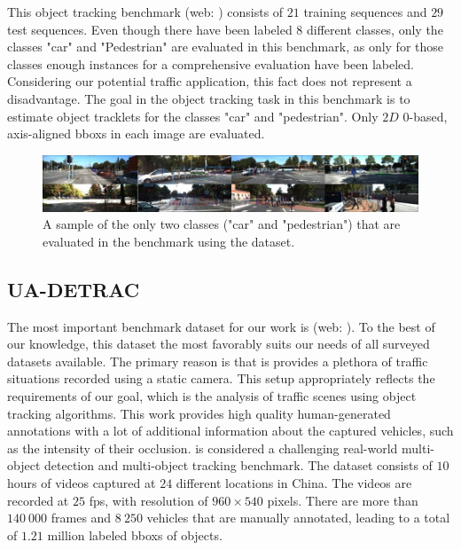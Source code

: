 This object tracking benchmark \cite{Geiger2012CVPR} (web: \cite{kittiobjecttrackingdataset}) consists of $21$ training sequences and $29$ test sequences. Even though there have been labeled $8$ different classes, only the classes "car" and "Pedestrian" are evaluated in this benchmark, as only for those classes enough instances for a comprehensive evaluation have been labeled. Considering our potential traffic application, this fact does not represent a disadvantage. The goal in the object tracking task in this benchmark is to estimate object tracklets for the classes "car" and "pedestrian". Only $2D$ $0$-based, axis-aligned \glspl{bbox} in each image are evaluated.

\begin{figure}[t]
    \centerline{\includegraphics[width=\linewidth]{figures/datasets/kitti_object_tracking_sample.jpg}}
    \caption[ dataset]{A sample of the only two classes ("car" and "pedestrian") that are evaluated in the benchmark using the  dataset. }
    \label{fig:DatasetKITTIObjectTracking}
\end{figure}

\subsection{UA-DETRAC}
\label{ssec:DatasetUADETRAC}

The most important benchmark dataset for our work is  \cite{CVIU_UA-DETRAC} (web: \cite{uadetracdataset}). To the best of our knowledge, this dataset the most favorably suits our needs of all surveyed datasets available. The primary reason is that is provides a plethora of traffic situations recorded using a static camera. This setup appropriately reflects the requirements of our goal, which is the analysis of traffic scenes using object tracking algorithms. This work provides high quality human-generated annotations with a lot of additional information about the captured vehicles, such as the intensity of their occlusion.
 is considered a challenging real-world multi-object detection and multi-object tracking benchmark. The dataset consists of $10$ hours of videos captured at $24$ different locations in China. The videos are recorded at $25$ \gls{fps}, with resolution of $960 \times 540$ pixels. There are more than $140\ 000$ frames and $8\ 250$ vehicles that are manually annotated, leading to a total of $1.21$ million labeled \glspl{bbox} of objects.


